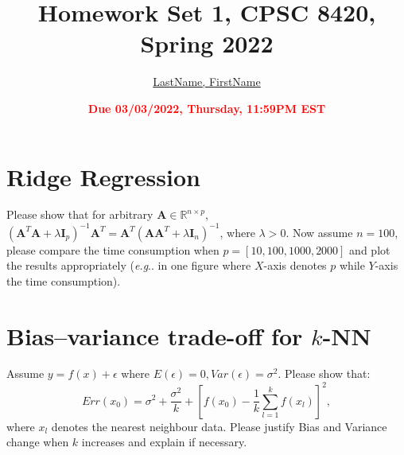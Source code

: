 \documentclass[11pt]{article}
\title{{\bf Homework Set 1, CPSC 8420, Spring 2022}}
\author{\Large\underline{LastName, FirstName}}
\date{\textbf{\Large\textcolor{red}{Due 03/03/2022, Thursday, 11:59PM EST}}}
\makeatletter
\newcommand{\R}{\mathbb{R}}
\newcommand{\minimize}{\operatorname*{minimize\ }}
\newcommand{\maximize}{\operatorname*{maximize}}
\newcommand{\mtx}[1]{\mathbf{#1}}
\newcommand{\vct}[1]{\mathbf{#1}}
\def \mA {\mtx{A}}
\def \mI {\mtx{I}}
\def \mU {\mtx{U}}
\def \mS {\mtx{S}}
\def \mX {\mtx{X}}
\def \vv {\vct{v}}
\def \R {\mathbb{R}}
\DeclareRobustCommand\onedot{\futurelet\@let@token\@onedot}
\def\@onedot{\ifx\@let@token.\else.\null\fi\xspace}
\def\eg{\emph{e.g}\onedot} \def\Eg{\emph{E.g}\onedot}
\makeatother
\begin{document}
\maketitle

\section*{Ridge Regression}
Please show that for arbitrary $\mA\in\R^{n\times p}$, $(\mA^T\mA+\lambda\mI_p)^{-1}\mA^T=\mA^T(\mA\mA^T+\lambda\mI_n)^{-1}$, where $\lambda>0$. Now assume $n=100$, please compare the time consumption when $p=[10,100,1000,2000]$ and plot the results appropriately (\eg in one figure where $X$-axis denotes $p$ while $Y$-axis the time consumption).
\vspace{4cm}

\section*{Bias–variance trade-off for $k$-NN}
Assume $y=f(x)+\epsilon$ where $E(\epsilon)=0, Var(\epsilon)=\sigma^2$. Please show that:
\begin{equation}
	Err(x_0)=\sigma^2+\frac{\sigma^2}{k}+[f(x_0)-\frac{1}{k}\sum_{l=1}^{k}f(x_l)]^2,
\end{equation}
where $x_l$ denotes the nearest neighbour data.  Please justify Bias and Variance change when $k$ increases and explain if necessary.
\vspace{4cm}
\end{document}
